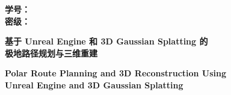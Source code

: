 \begin{titlepage}
\thispagestyle{empty}
\begin{center}

\vspace*{0.5cm}

\begin{flushright}
\fontsize{12pt}{18pt}\selectfont
\textbf{学\hspace{2em}号：}\underline{}\\[0.3cm]
\textbf{密\hspace{2em}级：}\underline{}
\end{flushright}

\vspace{1.2cm}

{\fontsize{22pt}{33pt}\selectfont\bfseries
基于 Unreal Engine 和 3D Gaussian Splatting 的\\[0.4cm]
极地路径规划与三维重建}

\vspace{1cm}

{\fontsize{18pt}{27pt}\selectfont\bfseries
Polar Route Planning and 3D Reconstruction Using\\[0.2cm]
Unreal Engine and 3D Gaussian Splatting}

\vspace{2cm}


\end{center}
\end{titlepage}
